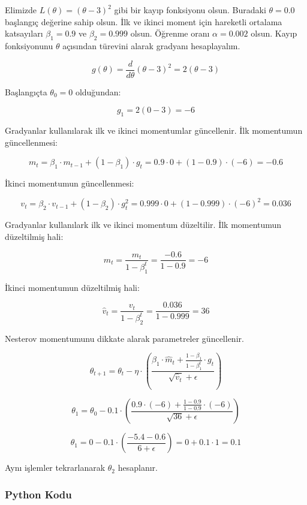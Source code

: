 Elimizde $L(\theta) = (\theta - 3)^2$ gibi bir kayıp fonksiyonu olsun. Buradaki $\theta = 0.0$ başlangıç değerine sahip olsun. İlk ve ikinci moment için hareketli ortalama katsayıları $\beta_1 = 0.9$ ve $\beta_2 = 0.999$ olsun. Öğrenme oranı $\alpha = 0.002$ olsun. Kayıp fonksiyonunu $\theta$ açısından türevini alarak gradyanı hesaplayalım.

\[ g(\theta) = \frac{d}{d \theta} (\theta - 3)^2 = 2 (\theta - 3) \]

Başlangıçta $\theta_0 = 0$ olduğundan:

\[ g_1 = 2 (0 - 3) = -6 \]

Gradyanlar kullanılarak ilk ve ikinci momentumlar güncellenir. İlk momentumun güncellenmesi:

\[ m_t = \beta_1 \cdot m_{t-1} + (1 - \beta_1) \cdot g_t = 0.9 \cdot 0 + (1 - 0.9) \cdot (-6) = -0.6 \]

İkinci momentumun güncellenmesi:

\[ v_t = \beta_2 \cdot v_{t-1} + (1 - \beta_2) \cdot g_{t}^2 = 0.999 \cdot 0 + (1 - 0.999) \cdot (-6)^2 = 0.036 \]

Gradyanlar kullanılark ilk ve ikinci momentum düzeltilir. İlk momentumun düzeltilmiş hali:

\[ \hat{m}_t = \frac{m_t}{1 - \beta_{1}^t} = \frac{-0.6}{1 - 0.9} = -6 \]

İkinci momentumun düzeltilmiş hali:

\[ \hat{v}_t = \frac{v_t}{1 - \beta_{2}^t} = \frac{0.036}{1 - 0.999} = 36 \]

Nesterov momentumunu dikkate alarak parametreler güncellenir.

\[ \theta_{t+1} = \theta_t - \eta \cdot (\frac{\beta_1 \cdot \hat{m}_t + \frac{1 - \beta_1}{1 - \beta_{1}^t}\cdot g_t}{\sqrt{\hat{v}_t} + \epsilon}) \]

\[ \theta_1 = \theta_0 - 0.1 \cdot (\frac{0.9 \cdot (-6) + \frac{1 - 0.9}{1 -0.9} \cdot (-6)}{\sqrt{36} + \epsilon})\]

\[ \theta_1 = 0 - 0.1 \cdot (\frac{-5.4 - 0.6}{6 + \epsilon}) = 0 + 0.1 \cdot 1 = 0.1 \]

Aynı işlemler tekrarlanarak $\theta_2$ hesaplanır.

\subsubsection{Python Kodu}

